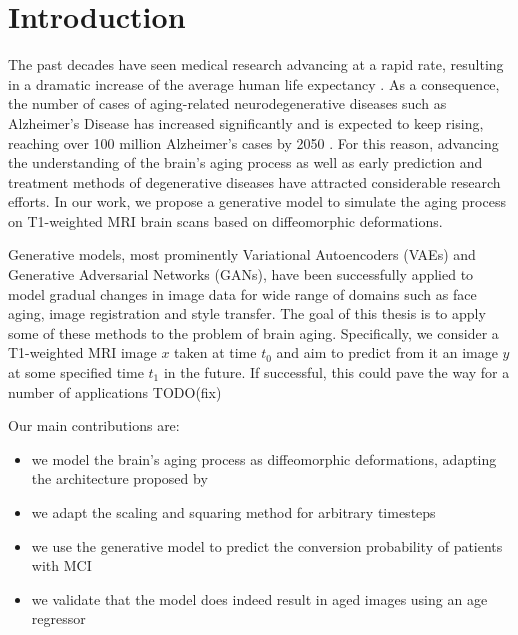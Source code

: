 \chapter{Introduction}




The past decades have seen medical research advancing at a rapid rate, resulting in a dramatic increase of the average human life expectancy \cite{owidlifeexpectancy}. As a consequence, the number of cases of aging-related neurodegenerative diseases such as Alzheimer's Disease has increased significantly and is expected to keep rising, reaching over 100 million Alzheimer's cases by 2050 \cite{brookmeyer2007forecasting}. For this reason, advancing the understanding of the brain's aging process as well as early prediction and treatment methods of degenerative diseases have attracted considerable research efforts. In our work, we propose a generative model to simulate the aging process on T1-weighted MRI brain scans based on diffeomorphic deformations.

Generative models, most prominently Variational Autoencoders (VAEs) and Generative Adversarial Networks (GANs), have been successfully applied to model gradual changes in image data for wide range of domains such as face aging, image registration and style transfer. The goal of this thesis is to apply some of these methods to the problem of brain aging. Specifically, we consider a T1-weighted MRI image $x$ taken at time $t_0$ and aim to predict from it an image $y$ at some specified time $t_1$ in the future. If successful, this could pave the way for a number of applications TODO(fix)

Our main contributions are:

\begin{itemize}
	\item we model the brain's aging process as diffeomorphic deformations, adapting the architecture proposed by \cite{dalca2018unsupervised}
	\item we adapt the scaling and squaring method for arbitrary timesteps
	\item we use the generative model to predict the conversion probability of patients with MCI
	\item we validate that the model does indeed result in aged images using an age regressor
\end{itemize}
